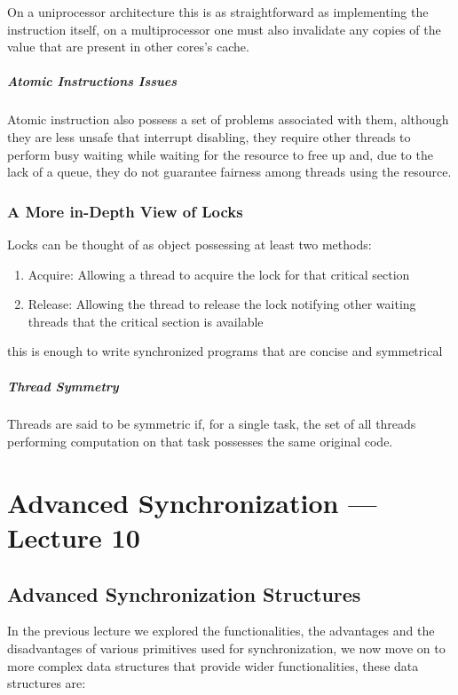 \documentclass[openright, twoside]{report}
\theoremstyle{definition}
\theoremstyle{example}
\begin{document}
		On a uniprocessor architecture this is as straightforward as implementing the 
		instruction itself, on a multiprocessor one must also invalidate any copies of the 
		value that are present in other cores's cache.

		\paragraph{Atomic Instructions Issues}
		Atomic instruction also possess a set of problems associated with them, although
		they are less unsafe that interrupt disabling, they require other threads to 
		perform busy waiting while waiting for the resource to free up and, due to the 
		lack of a queue, they do not guarantee fairness among threads using the resource.

		\subsection{A More in-Depth View of Locks}
		Locks can be thought of as object possessing at least two methods:
		\begin{enumerate}
			\item Acquire: Allowing a thread to acquire the lock for that critical section
			\item Release: Allowing the thread to release the lock notifying other 
			waiting threads that the critical section is available
		\end{enumerate}
		
		this is enough to write synchronized programs that are concise and symmetrical

			\paragraph{Thread Symmetry}
			Threads are said to be symmetric if, for a single task, the set of all threads 
			performing computation on that task possesses the same original code.
		
\chapter{Advanced Synchronization --- Lecture 10}
	\section{Advanced Synchronization Structures}
	\label{sec:sync_struct}
	In the previous lecture we explored the functionalities, the advantages and the 
	disadvantages of various primitives used for synchronization, we now move on 
	to more complex data structures that provide wider functionalities, these 
	data structures are:
\end{document}
